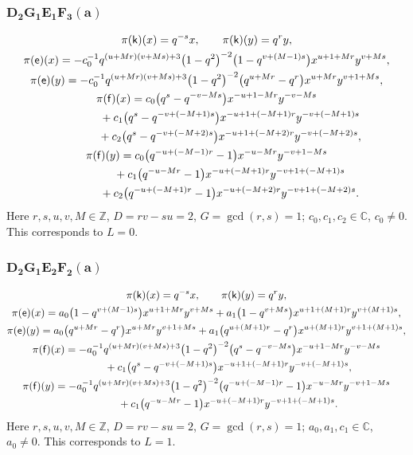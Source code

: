 \documentclass[pdftex]{sigma}
\numberwithin{equation}{section}
\begin{document}
\subsubsection*{$\boldsymbol{D_2G_1E_1F_3(a)}$}
\begin{gather*}
\pi(\mathsf{k})(x)= q^{-s}x ,\qquad\pi(\mathsf{k})(y)=q^ry ,\\
\pi(\mathsf{e})(x)= -c_0^{-1}q^{(u+Mr)(v+Ms)+3}\big(1-q^2\big)^{-2}\big(1-q^{v+(M-1)s}\big)x^{u+1+Mr}y^{v+Ms} ,\\
 \pi(\mathsf{e})(y)= -c_0^{-1}q^{(u+Mr)(v+Ms)+3}\big(1-q^2\big)^{-2}\big(q^{u+Mr}-q^r\big)x^{u+Mr}y^{v+1+Ms} ,\\
\pi(\mathsf{f})(x)=c_0\big(q^s-q^{-v-Ms}\big)x^{-u+1-Mr}y^{-v-Ms}\\
\hphantom{\pi(\mathsf{f})(x)=}{}+ c_1\big(q^s-q^{-v+(-M+1)s}\big)x^{-u+1+(-M+1)r}y^{-v+(-M+1)s}\\
\hphantom{\pi(\mathsf{f})(x)=}{}+ c_2\big(q^s-q^{-v+(-M+2)s}\big)x^{-u+1+(-M+2)r}y^{-v+(-M+2)s} ,\\
\pi(\mathsf{f})(y)= c_0\big(q^{-u+(-M-1)r}-1\big)x^{-u-Mr}y^{-v+1-Ms}\\
\hphantom{\pi(\mathsf{f})(y)=}{} + c_1\big(q^{-u-Mr}-1\big)x^{-u+(-M+1)r}y^{-v+1+(-M+1)s}\\
\hphantom{\pi(\mathsf{f})(y)=}{}+ c_2\big(q^{-u+(-M+1)r}-1\big)x^{-u+(-M+2)r}y^{-v+1+(-M+2)s} .
\end{gather*}
Here $r,s,u,v,M\in\mathbb{Z}$, $D=rv-su=2$, $G=\operatorname{gcd}(r,s)=1$; $c_0,c_1,c_2\in\mathbb{C}$, $c_0\ne 0$. This corresponds to $L=0$.

\subsubsection*{$\boldsymbol{D_2G_1E_2F_2(a)}$}
\begin{gather*}
\pi(\mathsf{k})(x)= q^{-s}x ,\qquad\pi(\mathsf{k})(y)=q^ry ,\\
\pi(\mathsf{e})(x)= a_0\big(1-q^{v+(M-1)s}\big)x^{u+1+Mr}y^{v+Ms}+ a_1\big(1-q^{v+Ms}\big)x^{u+1+(M+1)r}y^{v+(M+1)s} ,\\
\pi(\mathsf{e})(y)= a_0\big(q^{u+Mr}-q^r\big)x^{u+Mr}y^{v+1+Ms}+ a_1\big(q^{u+(M+1)r}-q^r\big)x^{u+(M+1)r}y^{v+1+(M+1)s} ,\\
\pi(\mathsf{f})(x)= -a_0^{-1}q^{(u+Mr)(v+Ms)+3}\big(1-q^2\big)^{-2}\big(q^s-q^{-v-Ms}\big)x^{-u+1-Mr}y^{-v-Ms}\\
\hphantom{\pi(\mathsf{f})(x)=}{}+ c_1\big(q^s-q^{-v+(-M+1)s}\big)x^{-u+1+(-M+1)r}y^{-v+(-M+1)s} ,\\
\pi(\mathsf{f})(y)= -a_0^{-1}q^{(u+Mr)(v+Ms)+3}\big(1-q^2\big)^{-2}\big(q^{-u+(-M-1)r}-1\big)x^{-u-Mr}y^{-v+1-Ms}\\
\hphantom{\pi(\mathsf{f})(y)=}{}+ c_1\big(q^{-u-Mr}-1\big)x^{-u+(-M+1)r}y^{-v+1+(-M+1)s} .
\end{gather*}
Here $r,s,u,v,M\in\mathbb{Z}$, $D=rv-su=2$, $G=\operatorname{gcd}(r,s)=1$; $a_0,a_1,c_1\in\mathbb{C}$, $a_0\ne 0$. This corresponds to $L=1$.
\end{document}
